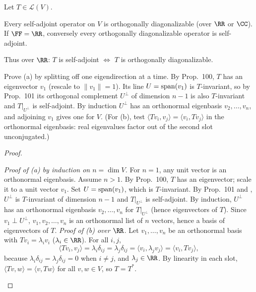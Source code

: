 \documentclass[10pt]{scrartcl}
\newcommand{\LL}{\mathcal L}\newcommand{\PP}{\mathcal P}\newcommand{\MM}{\mathcal M}
\begin{document}
\begin{theorem*}
  Let $T\in\LL(V)$.
  \begin{enumerate}
    \ii[(a)] Every self-adjoint operator on $V$ is orthogonally diagonalizable (over $\RR$ or $\CC$).
    \ii[(b)] If $\FF=\RR$, conversely every orthogonally diagonalizable operator is self-adjoint.
  \end{enumerate}
  Thus over $\RR$: $T$ is self-adjoint $\iff$ $T$ is orthogonally diagonalizable.
\end{theorem*}
\begin{ideabox}
  Prove (a) by splitting off one eigendirection at a time. By Prop.~100, $T$ has an eigenvector $v_1$ (rescale to $\|v_1\|=1$). Its line $U=\operatorname{span}(v_1)$ is $T$-invariant, so by Prop.~101 its orthogonal complement $U^\perp$ of dimension $n-1$ is also $T$-invariant and $T|_{U^\perp}$ is self-adjoint. By induction $U^\perp$ has an orthonormal eigenbasis $v_2,\dots,v_n$, and adjoining $v_1$ gives one for $V$. (For (b), test $\langle Tv_i,v_j\rangle=\langle v_i,Tv_j\rangle$ in the orthonormal eigenbasis: real eigenvalues factor out of the second slot unconjugated.)
\end{ideabox}
\begin{proof}
  \begin{steps}
    \ii \emph{Proof of (a) by induction on $n=\dim V$.} For $n=1$, any unit vector is an orthonormal eigenbasis. Assume $n>1$. By Prop.~100, $T$ has an eigenvector; scale it to a unit vector $v_1$. Set $U=\operatorname{span}(v_1)$, which is $T$-invariant. By Prop.~101 and , $U^\perp$ is $T$-invariant of dimension $n-1$ and $T|_{U^\perp}$ is self-adjoint. By induction, $U^\perp$ has an orthonormal eigenbasis $v_2,\dots,v_n$ for $T|_{U^\perp}$ (hence eigenvectors of $T$). Since $v_1\perp U^\perp$, $v_1,v_2,\dots,v_n$ is an orthonormal list of $n$ vectors, hence a basis  of eigenvectors of $T$.
    \ii \emph{Proof of (b) over $\RR$.} Let $v_1,\dots,v_n$ be an orthonormal basis with $Tv_i=\lambda_i v_i$ ($\lambda_i\in\RR$). For all $i,j$,
    \[
      \langle Tv_i,v_j\rangle = \lambda_i\delta_{ij} = \lambda_j\delta_{ij} = \langle v_i,\lambda_j v_j\rangle = \langle v_i,Tv_j\rangle,
    \]
    because $\lambda_i\delta_{ij}=\lambda_j\delta_{ij}=0$ when $i\neq j$, and $\lambda_j\in\RR$. By linearity in each slot, $\langle Tv,w\rangle=\langle v,Tw\rangle$ for all $v,w\in V$, so $T=T^*$.
  \end{steps}
\end{proof}
\end{document}
